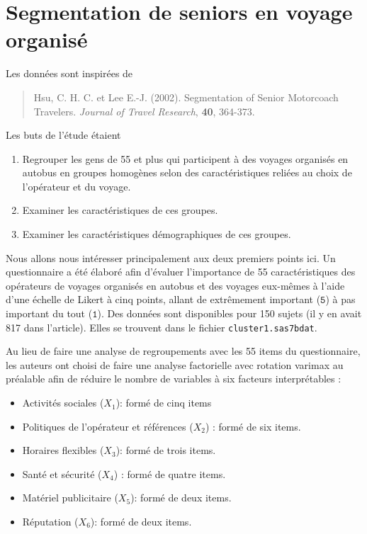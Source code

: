 \documentclass[
  11pt,
  letterpaper,
]{book}
\providecommand{\tightlist}{%
  \setlength{\itemsep}{0pt}\setlength{\parskip}{0pt}}
\theoremstyle{definition}
\theoremstyle{definition}
\theoremstyle{definition}
\theoremstyle{remark}
\begin{document}
\hypertarget{segmentation-de-seniors-en-voyage-organisuxe9}{%
\section{Segmentation de seniors en voyage organisé}\label{segmentation-de-seniors-en-voyage-organisuxe9}}

Les données sont inspirées de

\begin{quote}
Hsu, C. H. C. et Lee E.-J. (2002). Segmentation of Senior Motorcoach Travelers. \emph{Journal of Travel Research}, \textbf{40}, 364-373.
\end{quote}

Les buts de l'étude étaient

\begin{enumerate}
\def\labelenumi{\arabic{enumi})}
\tightlist
\item
  Regrouper les gens de 55 et plus qui participent à des voyages organisés en autobus en groupes homogènes selon des caractéristiques reliées au choix de l'opérateur et du voyage.
\item
  Examiner les caractéristiques de ces groupes.
\item
  Examiner les caractéristiques démographiques de ces groupes.
\end{enumerate}

Nous allons nous intéresser principalement aux deux premiers points ici. Un questionnaire a été élaboré afin d'évaluer l'importance de 55 caractéristiques des opérateurs de voyages organisés en autobus et des voyages eux-mêmes à l'aide d'une échelle de Likert à cinq points, allant de extrêmement important (\(\texttt{5}\)) à pas important du tout (\(\texttt{1}\)). Des données sont disponibles pour 150 sujets (il y en avait 817 dans l'article). Elles se trouvent dans le fichier \texttt{cluster1.sas7bdat}.

Au lieu de faire une analyse de regroupements avec les 55 items du questionnaire, les auteurs ont choisi de faire une analyse factorielle avec rotation varimax au préalable afin de réduire le nombre de variables à six facteurs interprétables :

\begin{itemize}
\tightlist
\item
  Activités sociales (\(X_1\)): formé de cinq items
\item
  Politiques de l'opérateur et références (\(X_2\)) : formé de six items.
\item
  Horaires flexibles (\(X_3\)): formé de trois items.
\item
  Santé et sécurité (\(X_4\)) : formé de quatre items.
\item
  Matériel publicitaire (\(X_5\)): formé de deux items.
\item
  Réputation (\(X_6\)): formé de deux items.
\end{itemize}
\end{document}
